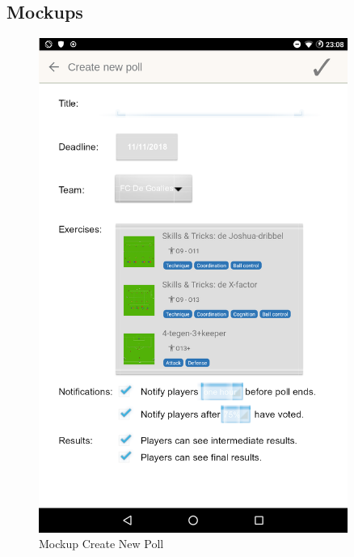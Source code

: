 \begin{appendices}
\newpage

\section{Mockups}
\label{appendix:mockups}

\begin{figure}[H]
    \centering
    \includegraphics[width=0.9\textwidth,keepaspectratio]{content/pictures/mockups/create.png}
    \caption{Mockup Create New Poll}
	\label{fig:mockup_create_poll}
\end{figure}


\end{appendices}
